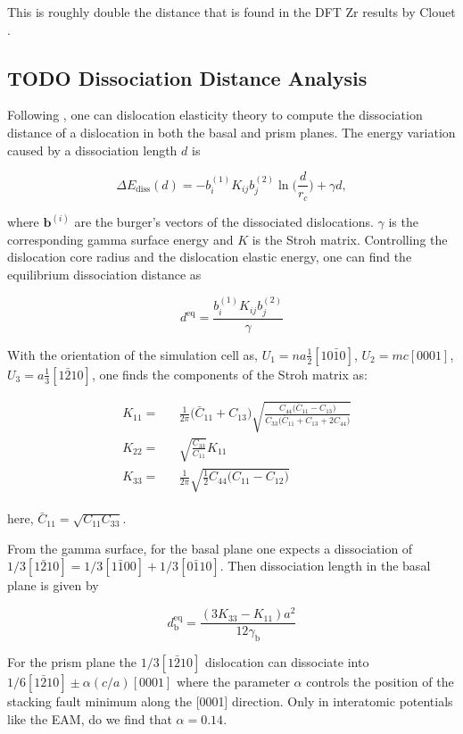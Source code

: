 \documentclass[11pt]{article}
\begin{document}
This is roughly double the distance that is found in the DFT Zr
results by Clouet \cite{Clouet2012}.

\subsection{{\bfseries\sffamily TODO} Dissociation Distance Analysis}
\label{sec:org111ce31}
Following \cite{Clouet2012}, one can dislocation elasticity theory to
compute the dissociation distance of a dislocation in both the
basal and prism planes.  The energy variation caused by a
dissociation length \(d\) is

\[ \Delta E_{\text{diss}}(d) = - b_i^{(1)}K_{ij}b_j^{(2)}\ln \big( \frac{d}{r_c}
   \big) + \gamma d,  \]

where \(\mathbf{b}^{(i)}\) are the burger's vectors of the dissociated
dislocations.  \(\gamma\) is the corresponding gamma surface energy and
\(K\) is the Stroh matrix. Controlling the dislocation core radius
and the dislocation elastic energy, one can find the equilibrium
dissociation distance as 

\[
   d^{\text{eq}} = \frac{ b_i^{(1)}K_{ij}b_j^{(2) }}{\gamma}
   \]


With the orientation of the simulation cell as, \(U_1 = na \frac{1}{2} [10\bar{1}0]\), \(U_2 = mc [0001]\), 
 \(U_3 =  a \frac{1}{3} [1\bar{2}10]\), one finds the components of
 the Stroh matrix as:

\begin{align}
&K_{11} =& &\frac{1}{2\pi} \big( \bar{C}_{11} + C_{13} \big)
      \sqrt{ \frac{ C_{44} \big( \bar{C}_{11} - C_{13} \big)  }{
	      C_{33} \big( \bar{C}_{11} + C_{13} + 2C_{44} \big)  } 
	   }
\\    
&K_{22 }=& &\sqrt{ \frac{ C_{33} }{ C_{11} }  } K_{11}
\\
&K_{33} =& &\frac{1}{2\pi} \sqrt{ \frac{1}{2} C_{44} \big( C_{11} - C_{12} \big)  }_{}
\end{align}

here, \(\bar{C}_{11} = \sqrt{ C_{11}C_{33} }\).


From the gamma surface, for the basal plane one expects a
dissociation of \(1/3[1\bar{2}10] = 1/3[1\bar{1}00] +
    1/3[0\bar{1}10]\). Then dissociation length in the basal plane is
given by 

\[
    d_{\text{b}}^{\text{eq}} = \frac{ ( 3K_{33} - K_{11} ) a^2 }{ 12 \gamma_{\text{b}} } 
    \]

For the prism plane the \(1/3[1\bar{2}10]\) dislocation can
dissociate into \(1/6[1\bar{2}10] \pm \alpha(c/a)[0001]\) where the
parameter \(\alpha\) controls the position of the stacking fault minimum
along the [0001] direction. Only in interatomic potentials like
the EAM, do we find that \(\alpha = 0.14\). 
\end{document}
